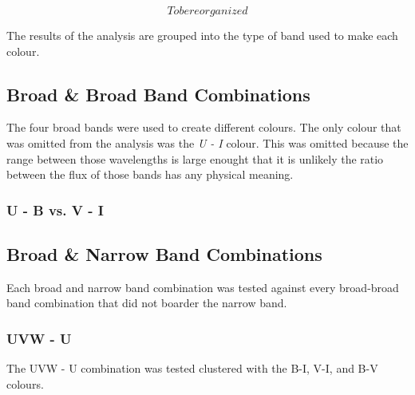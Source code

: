 
\[ To be reorganized \]

The results of the analysis are grouped into the type of band used to make each colour.  %

\subsection{Broad \& Broad Band Combinations}
The four broad bands were used to create different colours. The only colour that was omitted from the analysis was the \textit{U - I} colour.
This was omitted because the range between those wavelengths is large enought that it is unlikely the ratio between the flux of those bands has any physical meaning.

\subsubsection{U - B vs. V - I}

\subsection{Broad \& Narrow Band Combinations}
Each broad and narrow band combination was tested against every broad-broad band combination that did not boarder the narrow band.

\subsubsection{UVW - U}
The UVW - U combination was tested clustered with the B-I, V-I, and B-V colours. %

